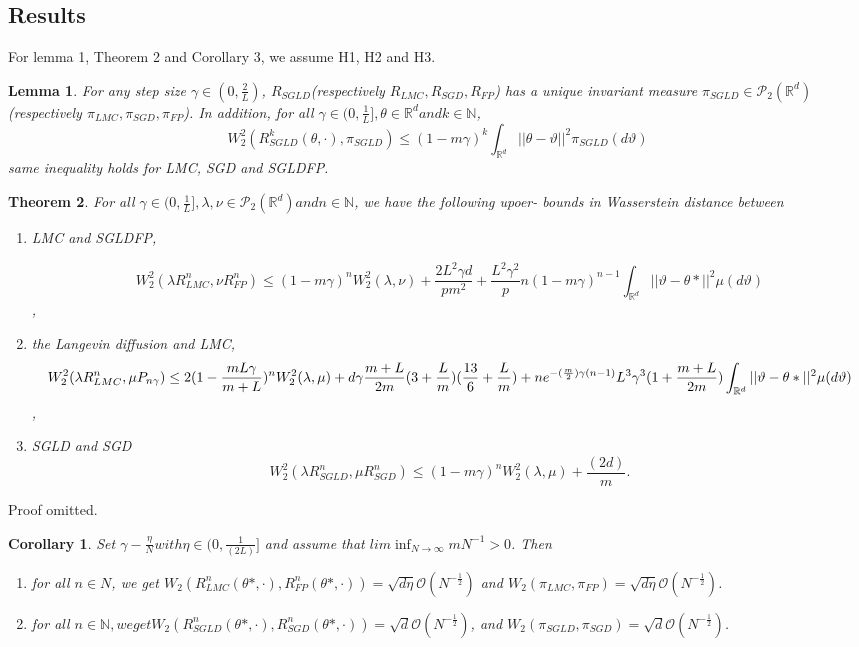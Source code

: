 \documentclass[a4paper]{article}
\newtheorem{theorem}{Theorem}
\newtheorem{lemma}[theorem]{Lemma}
\newtheorem{corollary}{Corollary}[theorem]
\begin{document}
\subsection{Results}
For lemma 1, Theorem 2 and Corollary 3, we assume H1, H2 and H3.
\begin{lemma}
For any step size $\gamma \in (0, \frac{2}{L})$, $R_{SGLD}$(respectively $R_{LMC}, R_{SGD}, R_{FP}$) has a unique invariant measure $\pi_{SGLD}\in \mathcal{P}_2(\mathbb{R}^d)$(respectively $\pi_{LMC}, \pi_{SGD}, \pi_{FP}$). In addition, for all $\gamma \in (0, \frac{1}{L}], \theta\in \mathbb{R}^d and k\in\mathbb{N}$,
$$W_2^2(R_{SGLD}^k(\theta, \cdot), \pi_{SGLD})\leq(1-m\gamma)^k\int_{\mathbb{R}^d}||\theta-\vartheta||^2\pi_{SGLD}(d\vartheta)$$
same inequality holds for LMC, SGD and SGLDFP.
\end{lemma}
\begin{theorem}
For all $\gamma\in(0,\frac{1}{L}], \lambda, \nu\in \mathcal{P}_2(\mathbb{R}^d) and n\in\mathbb{N}$, we have the following upoer- bounds in Wasserstein distance between
\begin{enumerate}
	\item 
	LMC and SGLDFP,

\begin{dmath}	
W_2^2(\lambda R_{LMC}^n, \nu R_{FP}^n)\leq(1-m\gamma)^nW_2^2(\lambda, \nu) + \frac{2L^2\gamma d}{pm^2}+\frac{L^2\gamma^2}{p}n(1-m\gamma)^{n-1}\int_{\mathbb{R}^d}||\vartheta-\theta*||^2 \mu(d\vartheta)
\end{dmath},
	\item 
	the Langevin diffusion and LMC,
\begin{dmath}
W_2^2(\lambda R_{LMC}^n, \mu P_{n\gamma})\leq2(1-\frac{mL\gamma}{m+L})^nW_2^2(\lambda, \mu)+d\gamma\frac{m+L}{2m}(3+\frac{L}{m})(\frac{13}{6}+\frac{L}{m})\\+ne^{-(\frac{m}{2})\gamma(n-1)}L^3\gamma^3(1+\frac{m+L}{2m})\int_{\mathbb{R}^d}||\vartheta - \theta*||^2 \mu(d\vartheta)
\end{dmath},
	\item 
	SGLD and SGD
	\begin{dmath}
	W_2^2(\lambda R_{SGLD}^n, \mu R_{SGD}^n)\leq (1-m\gamma)^n W_2^2(\lambda, \mu)+\frac{(2d)}{m}.
	\end{dmath}
\end{enumerate}
\end{theorem}
Proof omitted.
\begin{corollary}
Set $\gamma - \frac{\eta}{N} with \eta \in (0, \frac{1}{(2L)}]$ and assume that $lim \inf_{N \to \infty}mN^{-1}>0$. Then
\begin{enumerate}
\item
for all $n \in N$, we get $W_2(R_{LMC}^n(\theta*, \cdot), R_{FP}^{n}(\theta*, \cdot)) = \sqrt{d\eta}\mathcal{O}(N^{-\frac{1}{2}})$ and $W_2(\pi_{LMC}, \pi_{FP}) = \sqrt{d\eta}\mathcal{O}(N^{-\frac{1}{2}})$.
\item 
for all $n\in \mathbb{N}, we get W_2(R_{SGLD}^{n}(\theta*, \cdot), R^n_{SGD}(\theta*, \cdot)) = \sqrt{d}\mathcal{O}(N^{-\frac{1}{2}})$, and $W_2(\pi_{SGLD}, \pi_{SGD}) = \sqrt{d}\mathcal{O}(N^{-\frac{1}{2}})$.
\end{enumerate}
\end{corollary}
\end{document}
